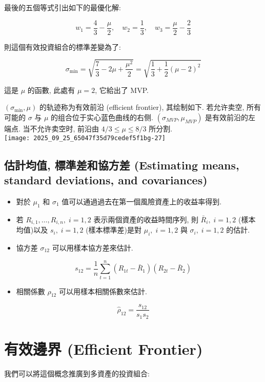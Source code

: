 \documentclass[letterpaper]{article}
\begin{document}
		最後的五個等式引出如下的最優化解: 
		
		
		$$
		w_{1}=\frac{4}{3}-\frac{\mu}{2}, \quad w_{2}=\frac{1}{3}, \quad w_{3}=\frac{\mu}{2}-\frac{2}{3}
		$$
		
		則這個有效投資組合的標準差變為了: 
		
		$$
		\sigma_{\min }=\sqrt{\frac{7}{3}-2 \mu+\frac{\mu^{2}}{2}}=\sqrt{\frac{1}{3}+\frac{1}{2} (\mu-2)^{2}}
		$$
		
		這是 $\mu$ 的函數, 此處有 $\mu=2$, 它給出了 MVP.
		
		$\left (\sigma_{\min}, \mu\right)$ 的轨迹称为有效前沿 (efficient frontier), 其绘制如下. 若允许卖空, 所有可能的 $\sigma$ 与 $\mu$ 的组合位于实心蓝色曲线的右侧. $ (\sigma_{MVP}, \mu_{MVP})$ 是有效前沿的左端点. 当不允许卖空时, 前沿由 $4/3 \leq \mu \leq 8/3$ 所分割. \\
		
		
		\texttt{[image: 2025\_09\_25\_65047f35d79cedef5f1bg-27]}
		
		\subsection{估計均值, 標準差和協方差 (Estimating means, standard deviations, and covariances)}
		\begin{itemize}
			\item 對於 $\mu_{1}$ 和 $\sigma_{1}$ 值可以通過過去在第一個風險資產上的收益率得到. 
			\item 若 $R_{i, 1}, \ldots, R_{i, n}, \; i=1, 2$ 表示兩個資產的收益時間序列, 則 $\bar{R}_{i}, \; i=1, 2$ (樣本均值)以及 $s_{i}, \; i=1, 2$ (樣本標準差)是對 $\mu_{i}, \; i=1, 2$ 與 $\sigma_{i}, \; i=1, 2$ 的估計. 
			\item 協方差 $\sigma_{12}$ 可以用樣本協方差來估計.
		\end{itemize}
		
		$$
		s_{12}=\frac{1}{n} \sum_{t=1}^{n}\left (R_{1 t}-\bar{R}_{1}\right)\left (R_{2 t}-\bar{R}_{2}\right)
		$$
		
		\begin{itemize}
			\item 相關係數 $\rho_{12}$ 可以用樣本相關係數來估計. 
		\end{itemize}
		
		$$
		\hat{\rho}_{12}=\frac{s_{12}}{s_{1} s_{2}}
		$$
		
		\section{有效邊界 (Efficient Frontier)}
		我們可以將這個概念推廣到多資產的投資組合: 
		
\end{document}
